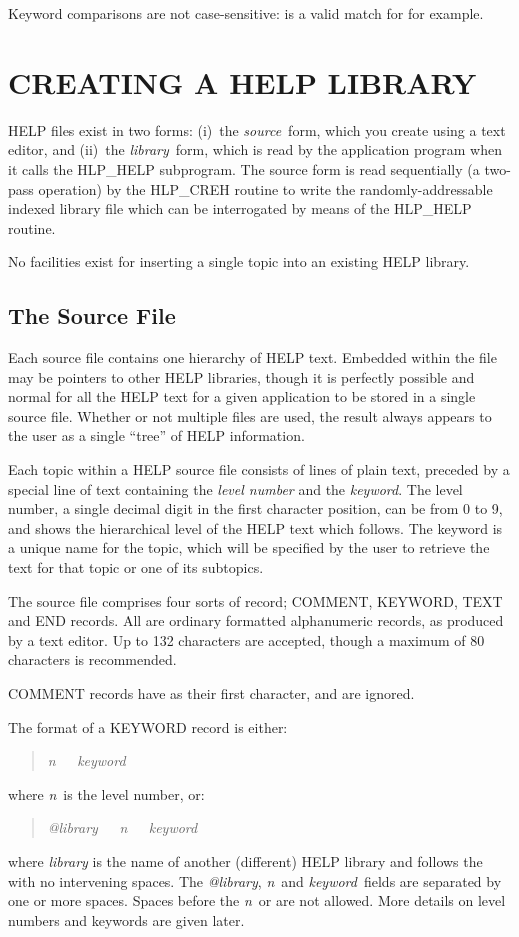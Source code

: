 Keyword comparisons are not case-sensitive:  is a valid match for
 for example.

\section{CREATING A HELP LIBRARY}
HELP files exist in two forms: (i)~the {\it source}\, form, which you
create using a text editor, and (ii)~the {\it library}\, form, which
is read by the application program when it
calls the HLP\_HELP subprogram.  The source form is read
sequentially (a two-pass operation) by the HLP\_CREH routine
to write the randomly-addressable indexed library file which
can be interrogated by means of the HLP\_HELP routine.

No facilities exist for inserting a single topic into an existing
HELP library.

\subsection{The Source File}
Each source file contains one hierarchy of HELP text.  Embedded
within the file may be pointers to other HELP libraries, though
it is perfectly possible and normal for all the HELP text for a given
application to be stored in a single source file.  Whether or not
multiple files are used, the result always appears to the user as a
single ``tree'' of HELP information.

Each topic within a HELP source file consists of lines of plain
text, preceded by a special line of text containing the {\it level
number} and the {\it keyword}.  The level number, a single decimal
digit in the first character position, can be from 0 to 9, and shows
the hierarchical level of the HELP text which follows.  The keyword
is a unique name for the topic, which will be specified by the
user to retrieve the text for that topic or one of its subtopics.

The source file comprises four sorts of record;  COMMENT, KEYWORD,
TEXT and END records.  All are ordinary formatted alphanumeric
records, as produced by a text editor.  Up to 132 characters
are accepted, though a maximum of 80 characters is recommended.

COMMENT records have \fstring{!} as their first character, and are ignored.

The format of a KEYWORD record is either:
\begin{verse}
{\it n~~~keyword}
\end{verse}
where {\it n}\, is the level number, or:
\begin{verse}
{\it @library~~~n~~~keyword}
\end{verse}
where {\it library} is the name of another (different) HELP library and
follows the  with no intervening spaces.  The {\it @library},
{\it n}\, and {\it keyword}\, fields are separated by one or more spaces.
Spaces before the {\it n}\, or  are
not allowed.  More details on level numbers and keywords are
given later.

